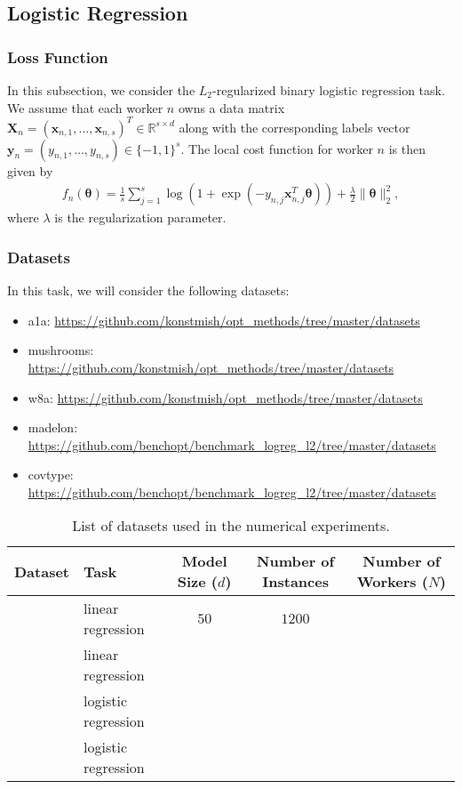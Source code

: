 \documentclass[12pt,draftclsnofoot,onecolumn]{IEEEtran}
\begin{document}
\subsection{Logistic Regression}
\subsubsection{Loss Function}
In this subsection, we consider the $L_2$-regularized binary logistic regression task. We assume that each worker $n$ owns a data matrix $\bm{X}_n = (\bm{x}_{n,1}, \dots, \bm{x}_{n,s})^T \in \mathbb{R}^{s \times d}$ along with the corresponding labels vector $\bm{y}_n = (y_{n,1}, \dots, y_{n,s}) \in \{-1, 1\}^{s}$. The local cost function for worker $n$ is then given by 
\begin{align}
f_n(\bm{\theta}) = \frac{1}{s} \sum_{j=1}^s \log\left( 1 + \exp\left(- y_{n,j} \bm{x}_{n,j}^T \bm{\theta} \right)\right) + \frac{\lambda}{2} \|\bm{\theta}\|_2^2,
\end{align}
where $\lambda$ is the regularization parameter.
\subsubsection{Datasets}
In this task, we will consider the following datasets:
\begin{itemize}
\item a1a:  \url{https://github.com/konstmish/opt_methods/tree/master/datasets}
\item mushrooms: \url{https://github.com/konstmish/opt_methods/tree/master/datasets}
\item w8a: \url{https://github.com/konstmish/opt_methods/tree/master/datasets}
\item madelon: \url{https://github.com/benchopt/benchmark_logreg_l2/tree/master/datasets}
\item covtype: \url{https://github.com/benchopt/benchmark_logreg_l2/tree/master/datasets}
\end{itemize}

\begin{table*}[h]
\centering
\begin{tabular}{|l|l|c|c|c|}
\hline
\textbf{Dataset} & \textbf{Task} & \textbf{Model Size ($d$)} & \textbf{Number of Instances} & \textbf{Number of Workers ($N$)} \\ \hline \hline
  & linear regression      & $50$  & $1200$ & $ $ \\ \hline
 & linear regression           &  &  & \\ \hline
 & logistic regression  &  & & \\ \hline
 & logistic regression       &  & & \\ \hline
\end{tabular}
\caption{List of datasets used in the numerical experiments.}
\label{table} 
\end{table*}
\end{document}
